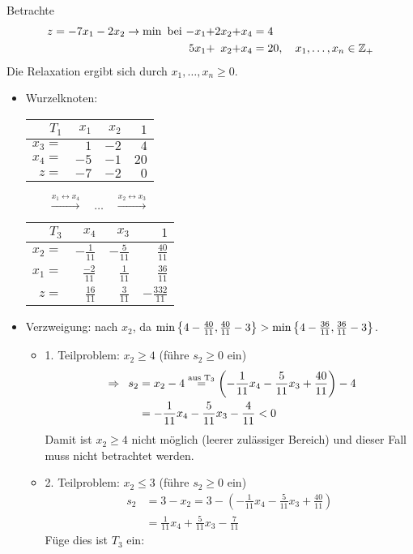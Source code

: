 \begin{beispiel}
	Betrachte 
	\begin{equation*}
	\begin{alignedat}{4}
		z = -7x_1 - 2x_2 \to \min \text{ bei } &&-x_1 &+ &2x_2 &+ &x_4 &= 4 \\
		&&5x_1 &+ &x_2 &+ &x_4 &= 20, \quad x_1, \dots, x_n \in \mathbb{Z}_+
	\end{alignedat}
	\end{equation*}
	Die Relaxation ergibt sich durch $x_1, \dots, x_n \ge 0$.
	\begin{itemize}[leftmargin=*]
		\item Wurzelknoten:
		\begin{center}
			\begin{tabular}{r|rr|r}
				$T_1$ & $x_1$ & $x_2$ & $1$ \\ \hline
				$x_3 = $ & $1$ & $-2$ & $4$ \\
				$x_4 = $ & $-5$ & $-1$ & $20$ \\ \hline
				$z = $   & $-7$ & $-2$ & $0$
			\end{tabular}
			$\qquad \overset{x_1 \leftrightarrow x_4}{\longrightarrow} \quad \dots \quad \overset{x_2 \leftrightarrow x_3}{\longrightarrow} \qquad$
			\begin{tabular}{r|rr|r}
				$T_3$ & $x_4$ & $x_3$ & $1$ \\ \hline
				$x_2 = $ & $-\frac{1}{11}$ & $-\frac{5}{11}$ & $\frac{40}{11}$ \\
				$x_1 = $ & $\frac{-2}{11}$ & $\frac{1}{11}$ & $\frac{36}{11}$ \\ \hline
				$z = $   & $\frac{16}{11}$ & $\frac{3}{11}$ & $-\frac{332}{11}$
			\end{tabular}
		\end{center}	
		\item Verzweigung: nach $x_2$, da $\min \left\{ 4-\frac{40}{11}, \frac{40}{11} - 3 \right\} > \min \left\{ 4 - \frac{36}{11}, \frac{36}{11} - 3 \right\}$. 
		\begin{itemize}
			\item 1. Teilproblem: $x_2 \ge 4$ (führe $s_2 \ge 0$ ein)
			\begin{equation*}
				\begin{aligned}
					\enskip \Rightarrow \enskip s_2 &= x_2 - 4 
					\overset{\text{aus T}_3}{=} \left( -\frac{1}{11}x_4 - \frac{5}{11} x_3 + \frac{40}{11} \right) - 4 \\
					&= -\frac{1}{11} x_4 - \frac{5}{11} x_3 - \frac{4}{11} < 0
				\end{aligned}
			\end{equation*}
			Damit ist $x_2 \ge 4$ nicht möglich (leerer zulässiger Bereich) und dieser Fall muss nicht betrachtet werden.
			\item 2. Teilproblem: $x_2 \le 3$ (führe $s_2 \ge 0$ ein)
			\begin{equation*}
				\begin{aligned}
					s_2 &= 3 - x_2 = 3 - (-\frac{1}{11} x_4 - \frac{5}{11} x_3 + \frac{40}{11}) \\
					&= \frac{1}{11} x_4 + \frac{5}{11} x_3 - \frac{7}{11}
				\end{aligned}
			\end{equation*}
			Füge dies ist $T_3$ ein:
			

\end{itemize}
\end{itemize}
\end{beispiel}
